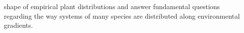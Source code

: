 \documentclass[11pt, a4paper]{article}
\begin{document}
shape of empirical plant distributions and answer fundamental questions regarding the way systems of many species are distributed along environmental gradients.







\end{document}
